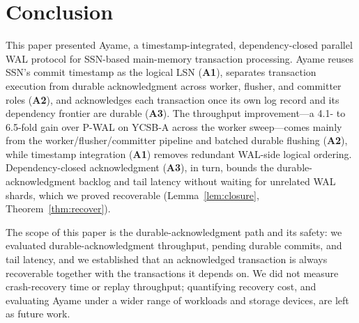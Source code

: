 \section{Conclusion}
\label{sec:conclusion}

This paper presented Ayame, a timestamp-integrated, dependency-closed parallel
WAL protocol for SSN-based main-memory transaction processing.  Ayame reuses
SSN's commit timestamp as the logical LSN (\textbf{A1}), separates transaction
execution from durable acknowledgment across worker, flusher, and committer
roles (\textbf{A2}), and acknowledges each transaction once its own log record
and its dependency frontier are durable (\textbf{A3}).  The throughput
improvement---a 4.1- to 6.5-fold gain over P-WAL on YCSB-A across the worker
sweep---comes mainly from the worker/flusher/committer pipeline and batched
durable flushing (\textbf{A2}), while timestamp integration (\textbf{A1})
removes redundant WAL-side logical ordering.  Dependency-closed acknowledgment
(\textbf{A3}), in turn, bounds the durable-acknowledgment backlog and tail
latency without waiting for unrelated WAL shards, which we proved recoverable
(Lemma~\ref{lem:closure}, Theorem~\ref{thm:recover}).

The scope of this paper is the durable-acknowledgment path and its safety: we
evaluated durable-acknowledgment throughput, pending durable commits, and tail
latency, and we established that an acknowledged transaction is always
recoverable together with the transactions it depends on.  We did not measure
crash-recovery time or replay throughput; quantifying recovery cost, and
evaluating Ayame under a wider range of workloads and storage devices, are left
as future work.
